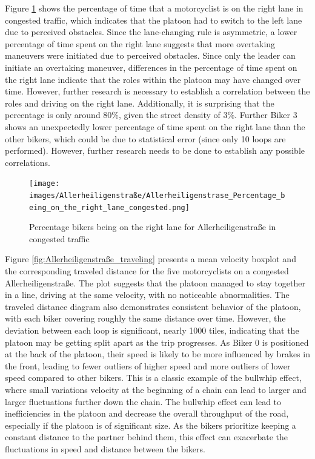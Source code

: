 Figure \ref{fig:Allerheiligenstraß_lane_histogram} shows the percentage of time that a motorcyclist is on the right lane in congested traffic, which indicates that the platoon had to switch to the left lane due to perceived obstacles. Since the lane-changing rule is asymmetric, a lower percentage of time spent on the right lane suggests that more overtaking maneuvers were initiated due to perceived obstacles. Since only the leader can initiate an overtaking maneuver, differences in the percentage of time spent on the right lane indicate that the roles within the platoon may have changed over time. However, further research is necessary to establish a correlation between the roles and driving on the right lane. Additionally, it is surprising that the percentage is only around 80\%, given the street density of 3\%. Further Biker 3 shows an unexpectedly lower percentage of time spent on the right lane than the other bikers, which could be due to statistical error (since only 10 loops are performed). However, further research needs to be done to establish any possible correlations.\\


\begin{figure}
\texttt{[image: images/Allerheiligenstraße/Allerheiligenstrase\_Percentage\_being\_on\_the\_right\_lane\_congested.png]}
\caption{Percentage bikers being on the right lane for Allerheiligenstraße in congested traffic}
\label{fig:Allerheiligenstraß_lane_histogram}
\end{figure}

Figure \ref{fig:Allerheiligenstraße_traveling} presents a mean velocity boxplot and the corresponding traveled distance for the five motorcyclists on a congested Allerheiligenstraße. The plot suggests that the platoon managed to stay together in a line, driving at the same velocity, with no noticeable abnormalities. The traveled distance diagram also demonstrates consistent behavior of the platoon, with each biker covering roughly the same distance over time. However, the deviation between each loop is significant, nearly 1000 tiles, indicating that the platoon may be getting split apart as the trip progresses.
As Biker 0 is positioned at the back of the platoon, their speed is likely to be more influenced by brakes in the front, leading to fewer outliers of higher speed and more outliers of lower speed compared to other bikers. This is a classic example of the bullwhip effect, where small variations velocity at the beginning of a chain can lead to larger and larger fluctuations further down the chain. The bullwhip effect can lead to inefficiencies in the platoon and decrease the overall throughput of the road, especially if the platoon is of significant size. As the bikers prioritize keeping a constant distance to the partner behind them, this effect can exacerbate the fluctuations in speed and distance between the bikers.\\

